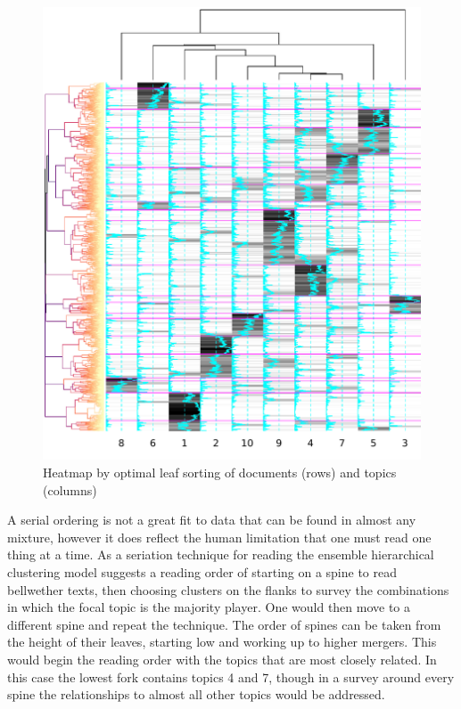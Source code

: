 \documentclass[]{book}
\theoremstyle{definition}
\theoremstyle{definition}
\theoremstyle{definition}
\theoremstyle{remark}
\begin{document}
\begin{figure}

{\centering \includegraphics[width=0.9\linewidth]{03_files/figure-latex/hotleaf-1} 

}

\caption{Heatmap by optimal leaf sorting of documents (rows) and topics (columns)}\label{fig:hotleaf}
\end{figure}

A serial ordering is not a great fit to data that can be found in almost
any mixture, however it does reflect the human limitation that one must
read one thing at a time. As a seriation technique for reading the
ensemble hierarchical clustering model suggests a reading order of
starting on a spine to read bellwether texts, then choosing clusters on
the flanks to survey the combinations in which the focal topic is the
majority player. One would then move to a different spine and repeat the
technique. The order of spines can be taken from the height of their
leaves, starting low and working up to higher mergers. This would begin
the reading order with the topics that are most closely related. In this
case the lowest fork contains topics 4 and 7, though in a survey around
every spine the relationships to almost all other topics would be
addressed.
\end{document}
